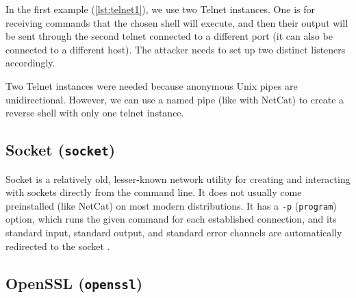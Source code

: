 In the first example (\cref{lst:telnet1}), we use two Telnet instances. One is for receiving commands that the chosen shell will execute, and then their output will be sent through the second telnet connected to a different port (it can also be connected to a different host). The attacker needs to set up two distinct listeners accordingly.



Two Telnet instances were needed because anonymous Unix pipes are unidirectional. However, we can use a named pipe (like with NetCat) to create a reverse shell with only one telnet instance.




\subsection{Socket (\texttt{socket})}


Socket is a relatively old, lesser-known network utility for creating and interacting with sockets directly from the command line. It does not usually come preinstalled (like NetCat) on most modern distributions. It has a \texttt{-p} (\texttt{program}) option, which runs the given command for each established connection, and its standard input, standard output, and standard error channels are automatically redirected to the socket \cite{socket-man}.




\subsection{OpenSSL (\texttt{openssl})}



